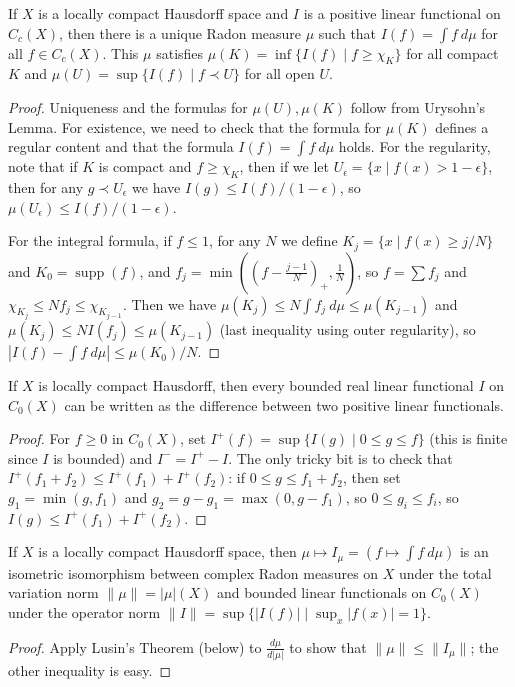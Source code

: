 \documentclass[letterpaper,11pt]{report}
\DeclareMathOperator{\supp}{supp}
\begin{document}
\begin{thm} If $X$ is a locally compact Hausdorff space and $I$ is a positive linear functional on $C_c(X)$, then there is a unique Radon measure $\mu$ such that $I(f) = \int f\ d\mu$ for all $f \in C_c(X)$. This $\mu$ satisfies $\mu(K) = \inf\{I(f) \mid f \ge \chi_K\}$ for all compact $K$ and $\mu(U) = \sup\{I(f) \mid f \prec U\}$ for all open $U$.
\end{thm}
\begin{proof} Uniqueness and the formulas for $\mu(U), \mu(K)$ follow from Urysohn's Lemma. For existence, we need to check that the formula for $\mu(K)$ defines a regular content and that the formula $I(f) = \int f\ d\mu$ holds. For the regularity, note that if $K$ is compact and $f \ge \chi_K$, then if we let $U_\epsilon = \{x \mid f(x) > 1 - \epsilon\}$, then for any $g \prec U_\epsilon$ we have $I(g) \le I(f)/(1-\epsilon)$, so $\mu(U_\epsilon) \le I(f)/(1-\epsilon)$.

For the integral formula, if $f \le 1$, for any $N$ we define $K_j = \{x \mid f(x) \ge j/N\}$ and $K_0 = \supp(f)$, and $f_j = \min((f - \frac{j-1}{N})_+, \frac{1}{N})$, so $f = \sum f_j$ and $\chi_{K_j} \le Nf_j \le \chi_{K_{j-1}}$. Then we have $\mu(K_j) \le N\int f_j\ d\mu \le \mu(K_{j-1})$ and $\mu(K_j) \le NI(f_j) \le \mu(K_{j-1})$ (last inequality using outer regularity), so $|I(f) - \int f\ d\mu| \le \mu(K_0)/N$.
\end{proof}

\begin{lem} If $X$ is locally compact Hausdorff, then every bounded real linear functional $I$ on $C_0(X)$ can be written as the difference between two positive linear functionals.
\end{lem}
\begin{proof} For $f \ge 0$ in $C_0(X)$, set $I^+(f) = \sup\{I(g) \mid 0 \le g \le f\}$ (this is finite since $I$ is bounded) and $I^- = I^+ - I$. The only tricky bit is to check that $I^+(f_1 + f_2) \le I^+(f_1) + I^+(f_2)$: if $0 \le g \le f_1 + f_2$, then set $g_1 = \min(g,f_1)$ and $g_2 = g - g_1 = \max(0,g-f_1)$, so $0 \le g_i \le f_i$, so $I(g) \le I^+(f_1) + I^+(f_2)$.
\end{proof}

\begin{thm} If $X$ is a locally compact Hausdorff space, then $\mu \mapsto I_\mu = (f \mapsto \int f\ d\mu)$ is an isometric isomorphism between complex Radon measures on $X$ under the total variation norm $\|\mu\| = |\mu|(X)$ and bounded linear functionals on $C_0(X)$ under the operator norm $\|I\| = \sup\{|I(f)| \mid \sup_x |f(x)| = 1\}$.
\end{thm}
\begin{proof} Apply Lusin's Theorem (below) to $\frac{d\mu}{d|\mu|}$ to show that $\|\mu\| \le \|I_\mu\|$; the other inequality is easy.
\end{proof}
\end{document}
